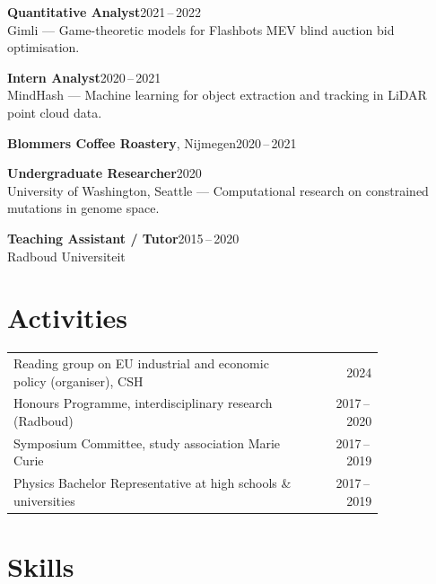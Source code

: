 \documentclass[10pt,a4paper]{article}
\begin{document}
\textbf{Quantitative Analyst}\hfill{\small\color{light}2021\,--\,2022}\\
{\small Gimli --- Game-theoretic models for Flashbots MEV blind auction bid optimisation.}

\vspace{0.25em}

\textbf{Intern Analyst}\hfill{\small\color{light}2020\,--\,2021}\\
{\small MindHash --- Machine learning for object extraction and tracking in LiDAR point cloud data.}

\vspace{0.25em}

\textbf{Blommers Coffee Roastery}, Nijmegen\hfill{\small\color{light}2020\,--\,2021}

\vspace{0.25em}

\textbf{Undergraduate Researcher}\hfill{\small\color{light}2020}\\
{\small University of Washington, Seattle --- Computational research on constrained mutations in genome space.}

\vspace{0.25em}

\textbf{Teaching Assistant / Tutor}\hfill{\small\color{light}2015\,--\,2020}\\
{\small Radboud Universiteit}

\section{Activities}

{\small
\begin{tabular}{@{}p{0.82\linewidth}r@{}}
Reading group on EU industrial and economic policy (organiser), CSH & \color{light}2024\\[0.1em]
Honours Programme, interdisciplinary research (Radboud) & \color{light}2017\,--\,2020\\[0.1em]
Symposium Committee, study association Marie Curie & \color{light}2017\,--\,2019\\[0.1em]
Physics Bachelor Representative at high schools \& universities & \color{light}2017\,--\,2019\\
\end{tabular}
}

\section{Skills}
\end{document}
